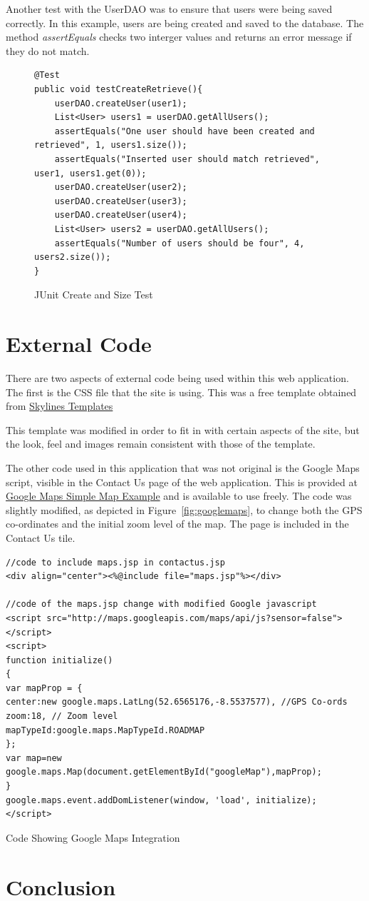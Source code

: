 Another test with the UserDAO was to ensure that users were being saved correctly. In this example, users are being created and saved to the database. The method \textit{assertEquals} checks two interger values and returns an error message if they do not match.

\begin{figure}[H]
\begin{lstlisting}
@Test 
public void testCreateRetrieve(){
	userDAO.createUser(user1);
	List<User> users1 = userDAO.getAllUsers();
	assertEquals("One user should have been created and retrieved", 1, users1.size());
	assertEquals("Inserted user should match retrieved", user1, users1.get(0));
	userDAO.createUser(user2);
	userDAO.createUser(user3);
	userDAO.createUser(user4);
	List<User> users2 = userDAO.getAllUsers();
	assertEquals("Number of users should be four", 4, users2.size());
}
\end{lstlisting}
\caption{JUnit Create and Size Test}
\end{figure}

\section{External Code}
There are two aspects of external code being used within this web application. The first is the CSS file that the site is using. This was a free template obtained from \href{http://skylinestemplates.blogspot.ie/2011/11/greefies-solution-xhtml-and-css.html}{Skylines Templates}

This template was modified in order to fit in with certain aspects of the site, but the look, feel and images remain consistent with those of the template.

The other code used in this application that was not original is the Google Maps script, visible in the Contact Us page of the web application. This is provided at \href{https://developers.google.com/maps/documentation/javascript/examples/map-simple}{Google Maps Simple Map Example} and is available to use freely. The code was slightly modified, as depicted in Figure~\ref{fig:googlemaps}, to change both the GPS co-ordinates and the initial zoom level of the map. The page is included in the Contact Us tile.\newline

\begin{table}[H]
\begin{lstlisting}
//code to include maps.jsp in contactus.jsp
<div align="center"><%@include file="maps.jsp"%></div>

//code of the maps.jsp change with modified Google javascript
<script src="http://maps.googleapis.com/maps/api/js?sensor=false">
</script>
<script>
function initialize()
{
var mapProp = {
center:new google.maps.LatLng(52.6565176,-8.5537577), //GPS Co-ords
zoom:18, // Zoom level
mapTypeId:google.maps.MapTypeId.ROADMAP
};
var map=new google.maps.Map(document.getElementById("googleMap"),mapProp);
}
google.maps.event.addDomListener(window, 'load', initialize);
</script>

\end{lstlisting}
\caption{Code Showing Google Maps Integration}
\label{fig:googlemaps}
\end{table}

\section{Conclusion}
